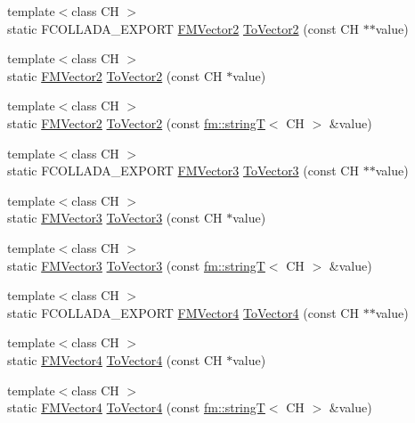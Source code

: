 \begin{DoxyCompactItemize}
\item 
{\footnotesize template$<$class CH $>$ }\\static FCOLLADA\_\-EXPORT \hyperlink{classFMVector2}{FMVector2} \hyperlink{classFUStringConversion_aadd5c84e8c1f0448308f5920884908a9}{ToVector2} (const CH $\ast$$\ast$value)
\item 
{\footnotesize template$<$class CH $>$ }\\static \hyperlink{classFMVector2}{FMVector2} \hyperlink{classFUStringConversion_a9b0ffddf8953b42852539eaf6354df68}{ToVector2} (const CH $\ast$value)
\item 
{\footnotesize template$<$class CH $>$ }\\static \hyperlink{classFMVector2}{FMVector2} \hyperlink{classFUStringConversion_abb2b490d8a4a8f5b87003d67f64a37c2}{ToVector2} (const \hyperlink{classfm_1_1stringT}{fm::stringT}$<$ CH $>$ \&value)
\item 
{\footnotesize template$<$class CH $>$ }\\static FCOLLADA\_\-EXPORT \hyperlink{classFMVector3}{FMVector3} \hyperlink{classFUStringConversion_a56ca60a515246656c1a057f58c2b9d43}{ToVector3} (const CH $\ast$$\ast$value)
\item 
{\footnotesize template$<$class CH $>$ }\\static \hyperlink{classFMVector3}{FMVector3} \hyperlink{classFUStringConversion_a2ff559e08b0fe2b0191140af08549103}{ToVector3} (const CH $\ast$value)
\item 
{\footnotesize template$<$class CH $>$ }\\static \hyperlink{classFMVector3}{FMVector3} \hyperlink{classFUStringConversion_a1fa4938bdc049c285d57a6c62db87146}{ToVector3} (const \hyperlink{classfm_1_1stringT}{fm::stringT}$<$ CH $>$ \&value)
\item 
{\footnotesize template$<$class CH $>$ }\\static FCOLLADA\_\-EXPORT \hyperlink{classFMVector4}{FMVector4} \hyperlink{classFUStringConversion_a4df7227423ebe89c7d00d1e596307a40}{ToVector4} (const CH $\ast$$\ast$value)
\item 
{\footnotesize template$<$class CH $>$ }\\static \hyperlink{classFMVector4}{FMVector4} \hyperlink{classFUStringConversion_a26bb83d87353c91548c24d252af9d3ba}{ToVector4} (const CH $\ast$value)
\item 
{\footnotesize template$<$class CH $>$ }\\static \hyperlink{classFMVector4}{FMVector4} \hyperlink{classFUStringConversion_aad2377404f9135e7e1ab29f9a98fdfab}{ToVector4} (const \hyperlink{classfm_1_1stringT}{fm::stringT}$<$ CH $>$ \&value)
$$
\end{DoxyCompactItemize}
